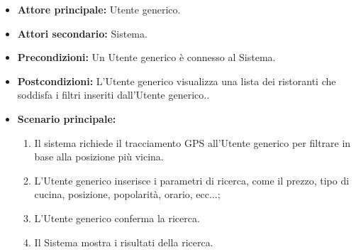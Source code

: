 \label{usecase:Sistema di filtraggio della lista dei ristoranti}
\begin{itemize}
	\item \textbf{Attore principale:} Utente generico.

	\item \textbf{Attori secondario:} Sistema.

	\item \textbf{Precondizioni:}
	      Un Utente generico è connesso al Sistema.

	\item \textbf{Postcondizioni:}
	      L'Utente generico visualizza una lista dei ristoranti che soddisfa i filtri inseriti dall'Utente generico..

	\item \textbf{Scenario principale:}
	      \begin{enumerate}
			  \item Il sistema richiede il tracciamento GPS all'Utente generico per filtrare in base alla posizione più vicina.
		      \item L'Utente generico inserisce i parametri di ricerca, come il prezzo, tipo di cucina, posizione, popolarità, orario, ecc...;
		      \item L'Utente generico conferma la ricerca.
		      \item Il Sistema mostra i risultati della ricerca.
	      \end{enumerate}
\end{itemize}
